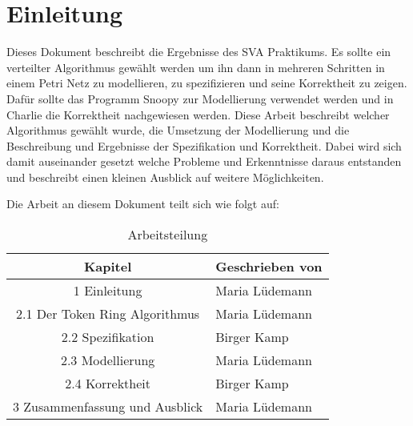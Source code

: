 \newpage
\section{Einleitung} 
Dieses Dokument beschreibt die Ergebnisse des SVA Praktikums. Es sollte ein verteilter Algorithmus gewählt werden um ihn dann in mehreren Schritten in einem Petri Netz zu modellieren, zu spezifizieren und seine Korrektheit zu zeigen. Dafür sollte das Programm Snoopy zur Modellierung verwendet werden und in Charlie die Korrektheit nachgewiesen werden. Diese Arbeit beschreibt welcher Algorithmus gewählt wurde, die Umsetzung der Modellierung und die Beschreibung und Ergebnisse der Spezifikation und Korrektheit.
Dabei wird sich damit auseinander gesetzt welche Probleme und Erkenntnisse daraus entstanden und beschreibt einen kleinen Ausblick auf weitere Möglichkeiten.

Die Arbeit an diesem Dokument teilt sich wie folgt auf:

\begin{table}[H]
\centering
 \begin{tabular}{|c|l|}
 \hline
    \textbf{Kapitel} & \textbf{Geschrieben von} \\
 \hline
 	1 Einleitung & Maria Lüdemann\\
 \hline
	2.1 Der Token Ring Algorithmus & Maria Lüdemann\\
 \hline
	2.2 Spezifikation & Birger Kamp\\
 \hline
	2.3 Modellierung & Maria Lüdemann\\
 \hline
	2.4 Korrektheit & Birger Kamp\\
 \hline
	3 Zusammenfassung und Ausblick & Maria Lüdemann\\
 \hline		 
 
 \end{tabular}
\caption{Arbeitsteilung}
\end{table}